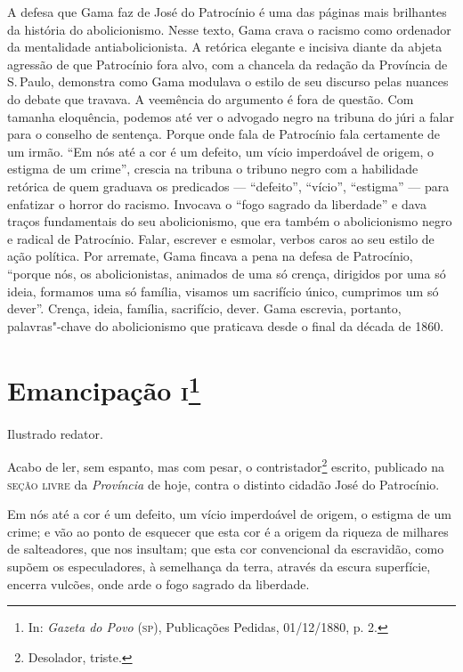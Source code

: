 {\small\noindent
A defesa que Gama faz de José do Patrocínio é uma das páginas mais
brilhantes da história do abolicionismo. Nesse texto, Gama crava o
racismo como ordenador da mentalidade antiabolicionista. A retórica
elegante e incisiva diante da abjeta agressão de que Patrocínio fora
alvo, com a chancela da redação da Província de S.\,Paulo, demonstra como
Gama modulava o estilo de seu discurso pelas nuances do debate que
travava. A veemência do argumento é fora de questão. Com tamanha
eloquência, podemos até ver o advogado negro na tribuna do júri a
falar para o conselho de sentença. Porque onde fala de Patrocínio fala
certamente de um irmão. ``Em nós até a cor é um defeito, um vício
imperdoável de origem, o estigma de um crime'', crescia na tribuna o
tribuno negro com a habilidade retórica de quem graduava os predicados
--- ``defeito'', ``vício'', ``estigma'' --- para enfatizar o horror do racismo.
Invocava o ``fogo sagrado da liberdade'' e dava traços fundamentais do seu
abolicionismo, que era também o abolicionismo negro e radical de Patrocínio.
Falar, escrever e esmolar, verbos caros ao seu estilo de ação política.
Por arremate, Gama fincava a pena na defesa de Patrocínio, ``porque nós,
os abolicionistas, animados de uma só crença, dirigidos por uma só
ideia, formamos uma só família, visamos um sacrifício único, cumprimos
um só dever''. Crença, ideia, família, sacrifício, dever. Gama escrevia,
portanto, palavras"-chave do abolicionismo que praticava desde o final da
década de 1860. }

\chapter{Emancipação \textsc{i}\footnote[*]{In: \emph{Gazeta do Povo}
  (\textsc{sp}), Publicações Pedidas, 01/12/1880, p. 2.}}


Ilustrado redator.

Acabo de ler, sem espanto, mas com pesar, o contristador\footnote{
  Desolador, triste.} escrito, publicado na \textsc{seção livre} da
\emph{Província} de hoje, contra o distinto cidadão José do Patrocínio.

Em nós até a cor é um defeito, um vício imperdoável de origem, o estigma
de um crime; e vão ao ponto de esquecer que esta cor é a origem da
riqueza de milhares de salteadores, que nos insultam; que esta cor
convencional da escravidão, como supõem os especuladores, à semelhança
da terra, através da escura superfície, encerra vulcões, onde arde o
fogo sagrado da liberdade.

